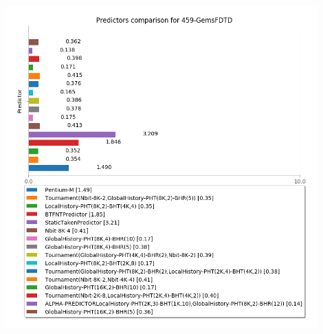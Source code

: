    \begin{minipage}{\textwidth}
      \begin{center}
         \\
         \vspace{3mm}
         \includegraphics[width=0.9\textwidth, frame]{./graphs/4-5/459-GemsFDTD.png}
         \vspace{6mm}
      \end{center}
   \end{minipage}

